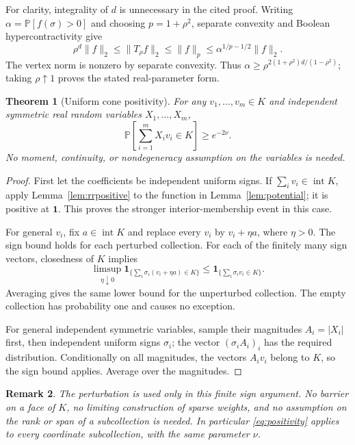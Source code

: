 \documentclass[11pt]{article}
\newtheorem{theorem}{Theorem}[section]
\newtheorem{remark}[theorem]{Remark}
\newcommand{\Prb}{\mathbb P}
\newcommand{\intr}{\operatorname{int}}
\newcommand{\one}{\mathbf 1}
\begin{document}
For clarity, integrality of $d$ is unnecessary in the cited proof.
Writing $\alpha=\Prb[f(\sigma)>0]$ and choosing
$p=1+\rho^2$, separate convexity and Boolean hypercontractivity give
\[
 \rho^d\|f\|_2\le\|T_\rho f\|_2
 \le\|f\|_p\le\alpha^{1/p-1/2}\|f\|_2.
\]
The vertex norm is nonzero by separate convexity.
Thus $\alpha\ge\rho^{2(1+\rho^2)d/(1-\rho^2)}$; taking
$\rho\uparrow1$ proves the stated real-parameter form.

\begin{theorem}[Uniform cone positivity]\label{thm:positivity}
For any $v_1,\ldots,v_m\in K$ and independent symmetric real random
variables $X_1,\ldots,X_m$,
\begin{equation}\label{eq:positivity}
 \Prb\left[\sum_{i=1}^m X_i v_i\in K\right]\ge e^{-2\nu}.
\end{equation}
No moment, continuity, or nondegeneracy assumption on the variables
is needed.
\end{theorem}
\begin{proof}
First let the coefficients be independent uniform signs. If
$\sum_i v_i\in\intr K$, apply Lemma~\ref{lem:rrpositive} to the
function in Lemma~\ref{lem:potential}; it is positive at $\one$.
This proves the stronger interior-membership event in this case.

For general $v_i$, fix $a\in\intr K$ and replace every $v_i$ by
$v_i+\eta a$, where $\eta>0$. The sign bound holds for each perturbed
collection. For each of the finitely many sign vectors, closedness of
$K$ implies
\[
 \limsup_{\eta\downarrow0}
 \one_{\{\sum_i\sigma_i(v_i+\eta a)\in K\}}
 \le \one_{\{\sum_i\sigma_i v_i\in K\}}.
\]
Averaging gives the same lower bound for the unperturbed collection.
The empty collection has probability one and causes no exception.

For general independent symmetric variables, sample their magnitudes
$A_i=|X_i|$ first, then independent uniform signs $\sigma_i$;
the vector $(\sigma_i A_i)_i$ has the required distribution.
Conditionally on all magnitudes, the vectors $A_i v_i$ belong to $K$,
so the sign bound applies. Average over the magnitudes.
\end{proof}

\begin{remark}
The perturbation is used only in this finite sign argument. No barrier
on a face of $K$, no limiting construction of sparse weights, and no
assumption on the rank or span of a subcollection is needed.
In particular \eqref{eq:positivity} applies to every coordinate
subcollection, with the same parameter $\nu$.
\end{remark}
\end{document}
